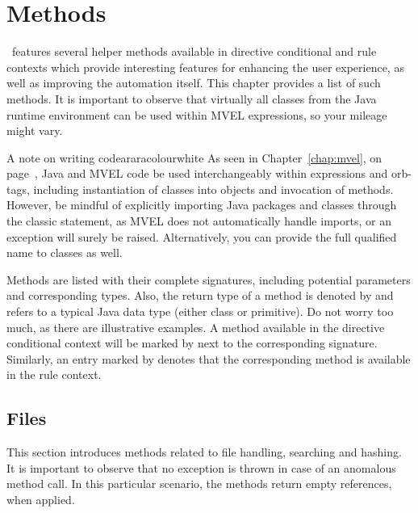\chapter{Methods}
\label{chap:methods}

\arara\ features several helper methods available in directive conditional and rule contexts which provide interesting features for enhancing the user experience, as well as improving the automation itself. This chapter provides a list of such methods. It is important to observe that virtually all classes from the Java runtime environment can be used within \gls{MVEL} expressions, so your mileage might vary.

\begin{messagebox}{A note on writing code}{araracolour}{\icok}{white}
As seen in Chapter~\ref{chap:mvel}, on page~\pageref{chap:mvel}, Java and \gls{MVEL} code be used interchangeably within expressions and \glspl{orb-tag}, including instantiation of classes into objects and invocation of methods. However, be mindful of explicitly importing Java packages and classes through the classic  statement, as \gls{MVEL} does not automatically handle imports, or an exception will surely be raised. Alternatively, you can provide the full qualified name to classes as well.
\end{messagebox}

Methods are listed with their complete signatures, including potential  parameters and corresponding types. Also, the return type of a method is denoted by  and refers to a typical Java data type (either class or primitive). Do not worry too much, as there are illustrative examples. A method available in the directive conditional context will be marked by  next to the corresponding signature. Similarly, an entry marked by  denotes that the corresponding method is available in the rule context.

\section{Files}
\label{sec:files}

This section introduces methods related to file handling, searching and hashing. It is important to observe that no exception is thrown in case of an anomalous method call. In this particular scenario, the methods return empty references, when applied.

